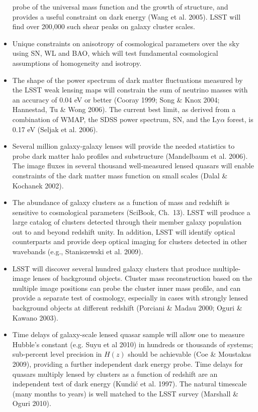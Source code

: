 \documentclass{emulateapj}
\begin{document}
\begin{itemize}
probe of the universal mass function and the growth of structure, and provides a useful 
constraint on dark energy (Wang et al. 2005). LSST will find over 200,000 such 
shear peaks on galaxy cluster scales. 
\item Unique constraints on anisotropy of cosmological parameters over the sky using
SN, WL and BAO, which will test fundamental cosmological assumptions of homogeneity and isotropy.
\item The shape of the power spectrum of dark matter fluctuations measured by
the LSST weak lensing maps will constrain the sum of neutrino masses with an accuracy 
of 0.04 eV or better (Cooray 1999; Song \& Knox 2004; Hannestad, Tu \& Wong 2006). 
The current best limit, as derived from a combination of WMAP, the SDSS power spectrum, 
SN, and the Ly$\alpha$ forest, is 0.17 eV (Seljak et al. 2006).
\item Several million  galaxy-galaxy lenses will provide the needed statistics to probe dark matter 
halo profiles and substructure (Mandelbaum et al. 2006). The image fluxes in several thousand well-measured
lensed quasars will enable constraints of the dark matter mass function on small scales (Dalal \& Kochanek 2002).
\item The abundance of galaxy clusters as a function of mass and redshift is sensitive to cosmological parameters
(SciBook, Ch.~13). LSST will produce a large catalog of clusters detected through their member galaxy population 
out to and beyond redshift unity.  In addition, LSST will identify optical counterparts and provide deep optical
imaging for clusters detected in other wavebands (e.g., Staniszewski et al. 2009). 
\item LSST will discover several hundred galaxy clusters that produce multiple-image lenses of background objects.
Cluster mass reconstruction based on the multiple image positions
 can probe the cluster inner mass profile, and can provide a separate test of cosmology, especially 
in cases with strongly lensed background objects at different redshift (Porciani \& Madau 2000; Oguri \& Kawano 2003).
\item Time delays of galaxy-scale lensed quasar sample will allow one to measure Hubble's constant 
(e.g. Suyu et al 2010) in hundreds or thousands of systems; sub-percent level precision in 
$H(z)$ should be achievable (Coe \& Moustakas 2009), providing a further independent dark energy probe. 
Time delays for quasars multiply lensed by clusters as a function of redshift are an independent test
of dark energy (Kundi\'{c} et al. 1997). The natural timescale (many months to years) is well matched
to the LSST survey (Marshall \& Oguri 2010). 
\end{itemize}
\end{document}
